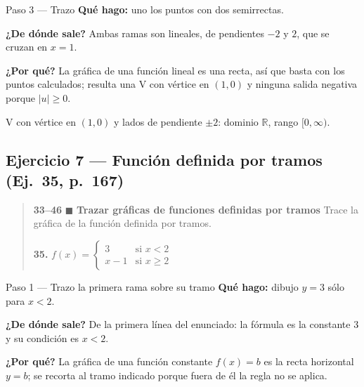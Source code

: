 \documentclass[11pt]{article}
\begin{document}
\begin{paso}{Paso 3 --- Trazo}
\textbf{Qué hago:} uno los puntos con dos semirrectas.

\textbf{¿De dónde sale?} Ambas ramas son lineales, de pendientes $-2$ y $2$, que se cruzan en $x=1$.

\textbf{¿Por qué?} La gráfica de una función lineal es una recta, así que basta con los puntos calculados; resulta una V con vértice en $(1,0)$ y ninguna salida negativa porque $|u|\ge0$.

\begin{center}
\end{center}
\end{paso}

\begin{resp}
V con vértice en $(1,0)$ y lados de pendiente $\pm 2$: dominio $\mathbb{R}$, rango $[0,\infty)$.
\end{resp}

\subsection*{Ejercicio 7 — Función definida por tramos (Ej.~35, p.~167)}

\begin{quote}
\textbf{33--46} $\blacksquare$ \textbf{Trazar gráficas de funciones definidas por tramos} \quad Trace la gráfica de la función definida por tramos.

\textbf{35.} $f(x)=\begin{cases}3 & \text{si } x<2\\ x-1 & \text{si } x\ge 2\end{cases}$
\end{quote}

\begin{paso}{Paso 1 --- Trazo la primera rama sobre su tramo}
\textbf{Qué hago:} dibujo $y=3$ sólo para $x<2$.

\textbf{¿De dónde sale?} De la primera línea del enunciado: la fórmula es la constante $3$ y su condición es $x<2$.

\textbf{¿Por qué?} La gráfica de una función constante $f(x)=b$ es la recta horizontal $y=b$; se recorta al tramo indicado porque fuera de él la regla no se aplica.
\end{paso}
\end{document}
